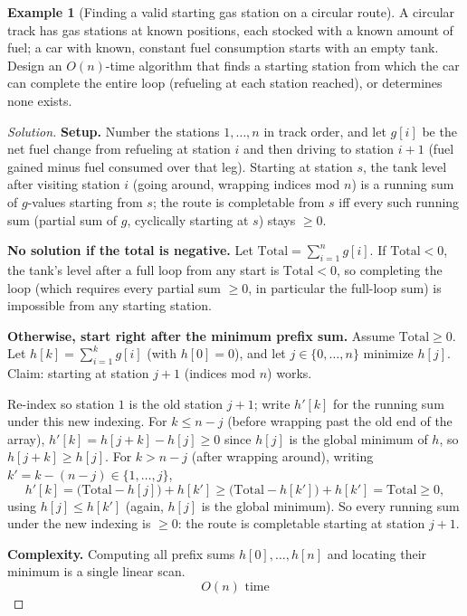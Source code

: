 \documentclass[11pt]{article}
\theoremstyle{definition}
\newtheorem{example}{Example}[section]
\begin{document}
\begin{example}[Finding a valid starting gas station on a circular route]
A circular track has gas stations at known positions, each stocked with a known amount of fuel; a car with known, constant fuel consumption starts with an empty tank. Design an $O(n)$-time algorithm that finds a starting station from which the car can complete the entire loop (refueling at each station reached), or determines none exists.
\end{example}
\begin{proof}[Solution]
\textbf{Setup.} Number the stations $1,\dots,n$ in track order, and let $g[i]$ be the net fuel change from refueling at station $i$ and then driving to station $i+1$ (fuel gained minus fuel consumed over that leg). Starting at station $s$, the tank level after visiting station $i$ (going around, wrapping indices mod $n$) is a running sum of $g$-values starting from $s$; the route is completable from $s$ iff every such running sum (partial sum of $g$, cyclically starting at $s$) stays $\ge0$.

\textbf{No solution if the total is negative.} Let $\mathrm{Total}=\sum_{i=1}^ng[i]$. If $\mathrm{Total}<0$, the tank's level after a full loop from any start is $\mathrm{Total}<0$, so completing the loop (which requires every partial sum $\ge0$, in particular the full-loop sum) is impossible from any starting station.

\textbf{Otherwise, start right after the minimum prefix sum.} Assume $\mathrm{Total}\ge0$. Let $h[k]=\sum_{i=1}^kg[i]$ (with $h[0]=0$), and let $j\in\{0,\dots,n\}$ minimize $h[j]$. Claim: starting at station $j+1$ (indices mod $n$) works.

Re-index so station $1$ is the old station $j+1$; write $h'[k]$ for the running sum under this new indexing. For $k\le n-j$ (before wrapping past the old end of the array), $h'[k]=h[j+k]-h[j]\ge0$ since $h[j]$ is the global minimum of $h$, so $h[j+k]\ge h[j]$. For $k>n-j$ (after wrapping around), writing $k'=k-(n-j)\in\{1,\dots,j\}$,
\[
h'[k]=\bigl(\mathrm{Total}-h[j]\bigr)+h[k']\ge\bigl(\mathrm{Total}-h[k']\bigr)+h[k']=\mathrm{Total}\ge0,
\]
using $h[j]\le h[k']$ (again, $h[j]$ is the global minimum). So every running sum under the new indexing is $\ge0$: the route is completable starting at station $j+1$.

\textbf{Complexity.} Computing all prefix sums $h[0],\dots,h[n]$ and locating their minimum is a single linear scan.
\[
\boxed{O(n)\text{ time}}
\]
\end{proof}
\end{document}
